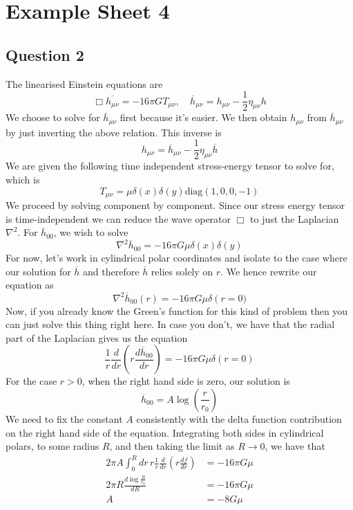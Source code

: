 \documentclass[11pt, a4paper]{article}   	%
\theoremstyle{slplain}
\begin{document}
\section{Example Sheet 4}
\subsection{Question 2} 

The linearised Einstein equations are 
\[
 \Box \overline{h _{ \mu \nu } }  = - 16 \pi G T_{ \mu \nu } , \quad 
 \overline{h } _{ \mu \nu }  = h _{ \mu \nu }   - \frac{1}{2 } \eta _{ \mu \nu } h 
\] We choose to solve for $ \overline{ h } _{\mu \nu } $ 
first because it's easier. We then obtain $ h _{ \mu \nu } $ from 
$ \overline{ h } _{ \mu \nu }  $  by just inverting the above relation. 
This inverse is 
\[
 h _{ \mu \nu }  = \overline{ h } _{ \mu \nu } - \frac{1}{2 } \eta _{ \mu \nu } \overline{h } 
\] We are given the following time independent 
stress-energy tensor to solve for, which is 
\[
	T _{ \mu \nu }  = \mu \delta \left( x  \right)  \delta \left( y  \right)  
	\text{diag}\left( 1, 0 , 0 , - 1  \right)  
\] We proceed by solving component by component. 
Since our stress energy tensor is time-independent we 
can reduce the wave operator $ \Box $ to just the Laplacian 
$ \nabla ^ 2 $. For $ \overline{ h } _{ 00 } $, we wish to solve 
\[
	\nabla ^ 2 \overline{ h } _{ 00 }   = - 16 \pi G \mu \delta \left( x  \right)\delta\left( y \right) 
\] For now, let's work in cylindrical polar 
coordinates and isolate to the case where 
our solution for $ \overline{ h } $ and therefore 
$ \overline{ h }  $ relies solely on $ r $. 
We hence rewrite our equation as 
\[
	\nabla ^ 2 \overline{ h } _{ 00 }\left( r  \right)  = - 16 \pi G \mu \delta\left(r = 0)  
\] Now, if you already know the 
Green's function for this kind of problem then 
you can just solve this thing right here. 
In case you don't, we have that the radial part of the Laplacian 
gives us the equation 
\[
	\frac{1}{r } \frac{d }{ dr } \left( r \frac{ d \overline{ h } _{ 0 0 } }{ d r } 		   \right) = - 16 \pi G \mu \delta \left(  r  =  0  \right)  
\]  For the case $ r > 0 $, when the 
right hand side is zero, our solution is 
\[
	\overline{ h }_{ 0 0 }  = A \log \left( \frac{r}{ r_0} \right) 
\] We need 
to fix the constant  $ A $ consistently with the 
delta function contribution on the 
right hand side of the equation. 
Integrating both sides in cylindrical polars, to 
some radius  $ R $, and then taking the limit as  $ R  \to 0 $, 
we have that 
\begin{align*}
	2 \pi A \int _{ 0 } ^ R dr \, r \frac{1}{r } \frac{ d  }{ dr } 
	\left( r \frac{ df }{ dr}  \right) &  =  - 16 \pi G \mu \\
	2 \pi R \frac{ d \log \frac{ R }{ r_ 0} }{ d R }  & =  - 16 \pi G \mu \\
	A & = - 8 G \mu 
\end{align*}
\end{document}
